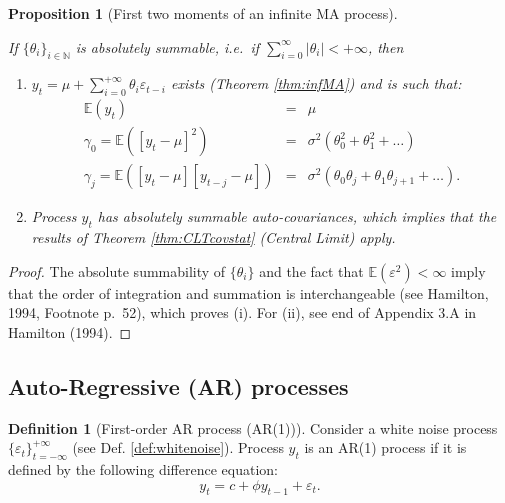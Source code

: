\documentclass[
  12pt,
]{book}
\providecommand{\tightlist}{%
  \setlength{\itemsep}{0pt}\setlength{\parskip}{0pt}}
\newtheorem{proposition}{Proposition}[chapter]
\theoremstyle{definition}
\newtheorem{definition}{Definition}[chapter]
\theoremstyle{definition}
\theoremstyle{definition}
\theoremstyle{definition}
\theoremstyle{remark}
\begin{document}
\begin{proposition}[First two moments of an infinite MA process]
\protect\hypertarget{prp:momentsMAinf}{}\label{prp:momentsMAinf}

If \(\{\theta_{i}\}_{i\in\mathbb{N}}\) is absolutely summable, i.e.~if \(\sum_{i=0}^{\infty}|\theta_i| < + \infty\), then

\begin{enumerate}
\def\labelenumi{\roman{enumi}.}
\tightlist
\item
  \(y_t = \mu + \sum_{i=0}^{+\infty} \theta_{i} \varepsilon_{t-i}\) exists (Theorem \ref{thm:infMA}) and is such that:
  \begin{eqnarray*}
  \mathbb{E}(y_t) &=& \mu\\
  \gamma_0 = \mathbb{E}([y_t-\mu]^2) &=& \sigma^2(\theta_0^2 +\theta_1^2 + \dots)\\
  \gamma_j = \mathbb{E}([y_t-\mu][y_{t-j}-\mu]) &=& \sigma^2(\theta_0\theta_j + \theta_{1}\theta_{j+1} + \dots).
  \end{eqnarray*}
\item
  Process \(y_t\) has absolutely summable auto-covariances, which implies that the results of Theorem \ref{thm:CLTcovstat} (Central Limit) apply.
\end{enumerate}

\end{proposition}

\begin{proof}
The absolute summability of \(\{\theta_{i}\}\) and the fact that \(\mathbb{E}(\varepsilon^2)<\infty\) imply that the order of integration and summation is interchangeable (see Hamilton, 1994, Footnote p.~52), which proves (i). For (ii), see end of Appendix 3.A in Hamilton (1994).
\end{proof}

\hypertarget{ARsection}{%
\subsection{Auto-Regressive (AR) processes}\label{ARsection}}

\begin{definition}[First-order AR process (AR(1))]
\protect\hypertarget{def:AR1}{}\label{def:AR1}Consider a white noise process \(\{\varepsilon_t\}_{t = -\infty}^{+\infty}\) (see Def. \ref{def:whitenoise}). Process \(y_t\) is an AR(1) process if it is defined by the following difference equation:
\[
y_t = c + \phi y_{t-1} + \varepsilon_t.
\]
\end{definition}
\end{document}
